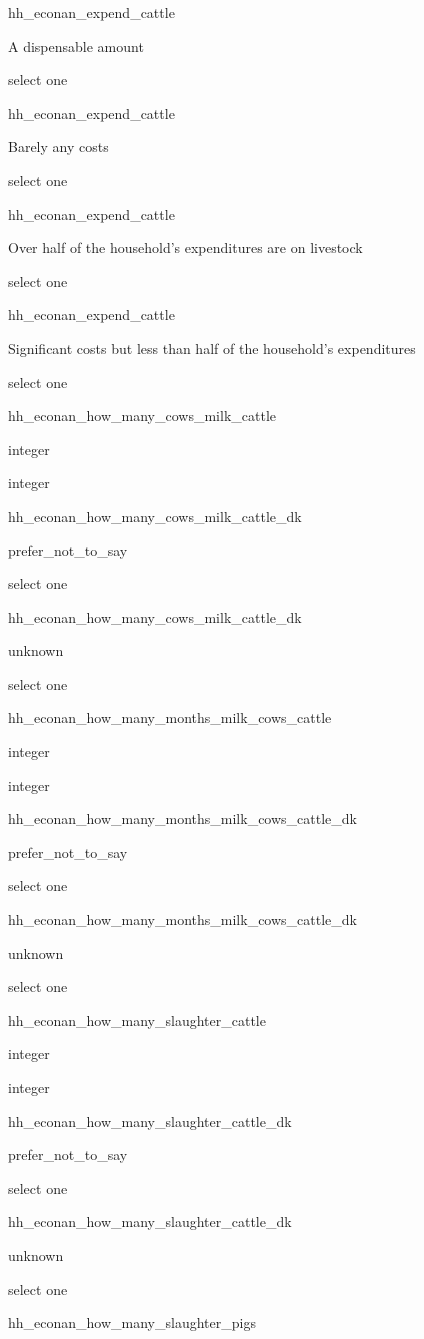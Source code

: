 \documentclass[]{article}
\begin{document}
hh\_econan\_expend\_cattle

A dispensable amount

select one

hh\_econan\_expend\_cattle

Barely any costs

select one

hh\_econan\_expend\_cattle

Over half of the household's expenditures are on livestock

select one

hh\_econan\_expend\_cattle

Significant costs but less than half of the household's expenditures

select one

hh\_econan\_how\_many\_cows\_milk\_cattle

integer

integer

hh\_econan\_how\_many\_cows\_milk\_cattle\_dk

prefer\_not\_to\_say

select one

hh\_econan\_how\_many\_cows\_milk\_cattle\_dk

unknown

select one

hh\_econan\_how\_many\_months\_milk\_cows\_cattle

integer

integer

hh\_econan\_how\_many\_months\_milk\_cows\_cattle\_dk

prefer\_not\_to\_say

select one

hh\_econan\_how\_many\_months\_milk\_cows\_cattle\_dk

unknown

select one

hh\_econan\_how\_many\_slaughter\_cattle

integer

integer

hh\_econan\_how\_many\_slaughter\_cattle\_dk

prefer\_not\_to\_say

select one

hh\_econan\_how\_many\_slaughter\_cattle\_dk

unknown

select one

hh\_econan\_how\_many\_slaughter\_pigs
\end{document}
